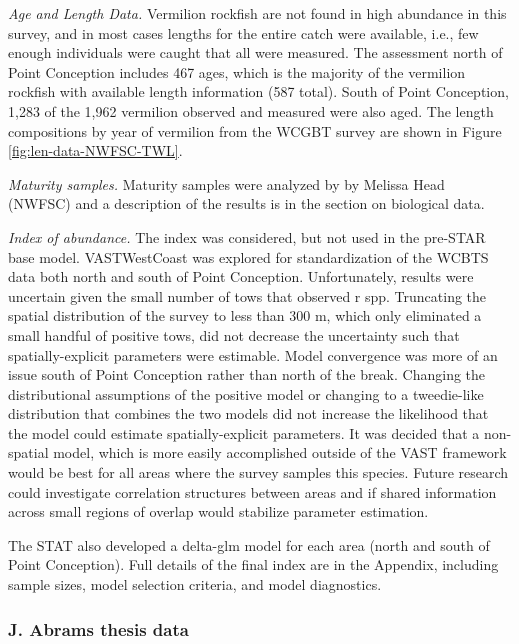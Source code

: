 \documentclass[
  english,
  a4paper,
]{article}
\begin{document}
\emph{Age and Length Data.} Vermilion rockfish are not found in high abundance in this survey, and in most
cases lengths for the entire catch were available, i.e., few enough individuals were caught that
all were measured. The assessment north of Point Conception includes 467 ages, which
is the majority of the vermilion rockfish with available length information (587 total).
South of Point Conception, 1,283 of the 1,962 vermilion observed and measured were also aged.
The length compositions by year of vermilion from the WCGBT survey are shown in Figure \ref{fig:len-data-NWFSC-TWL}.

\emph{Maturity samples.} Maturity samples were analyzed by by Melissa Head (NWFSC) and a
description of the results is in the section on biological data.

\emph{Index of abundance.} The index was considered, but not used in the pre-STAR base model.
VASTWestCoast was explored for standardization of the WCBTS data both north and south of Point Conception. Unfortunately, results were uncertain given the small number of tows that observed r spp. Truncating the spatial distribution of the survey to less than 300 m, which only eliminated a small handful of positive tows, did not decrease the uncertainty such that spatially-explicit parameters were estimable. Model convergence was more of an issue south of Point Conception rather than north of the break. Changing the distributional assumptions of the positive model or changing to a tweedie-like distribution that combines the two models did not increase the likelihood that the model could estimate spatially-explicit parameters. It was decided that a non-spatial model, which is more easily accomplished outside of the VAST framework would be best for all areas where the survey samples this species. Future research could investigate correlation structures between areas and if shared information across small regions of overlap would stabilize parameter estimation.

The STAT also developed
a delta-glm model for each area (north and south of Point Conception). Full details
of the final index are in the Appendix, including
sample sizes, model selection criteria, and model diagnostics.

\hypertarget{j.-abrams-thesis-data}{%
\subsubsection{J. Abrams thesis data}\label{j.-abrams-thesis-data}}
\end{document}
